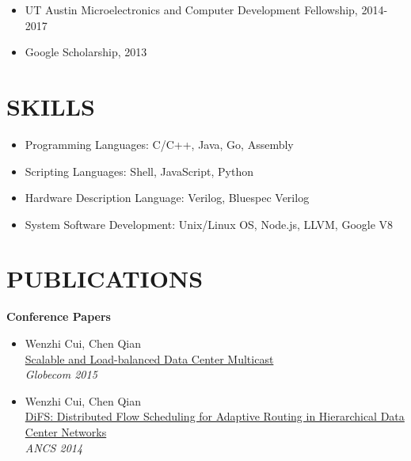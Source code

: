 \documentclass[margin, 9pt]{res} %
\begin{document}
\begin{resume}
\vspace*{-1pt}
\begin{itemize}[leftmargin=*] \itemsep -1pt
	\item UT Austin Microelectronics and Computer Development Fellowship, 2014-2017
	\item Google Scholarship, 2013
\end{itemize}

 
\section{SKILLS}

\vspace*{-1pt}
\begin{itemize}[leftmargin=*] \itemsep -4pt
	\item Programming Languages: C/C++, Java, Go, Assembly
	\item Scripting Languages: Shell, JavaScript, Python
	\item Hardware Description Language: Verilog, Bluespec Verilog
	\item System Software Development: Unix/Linux OS, Node.js, LLVM, Google V8
\end{itemize}

 
\section{PUBLICATIONS}

{\large\textbf{Conference Papers}}

\begin{itemize}[leftmargin=*] \itemsep 0pt
	\item Wenzhi Cui, Chen Qian\\
          \href{http://arxiv.org/pdf/1403.8065.pdf}{Scalable and Load-balanced Data Center Multicast}\\
          \textit{Globecom 2015}

	\item Wenzhi Cui, Chen Qian\\
          \href{http://www.cs.uky.edu/~qian/papers/DiFS.pdf}{DiFS: Distributed Flow Scheduling for Adaptive Routing in Hierarchical Data Center Networks}\\
          \textit{ANCS 2014}
\end{itemize}


\end{resume}
\end{document}
